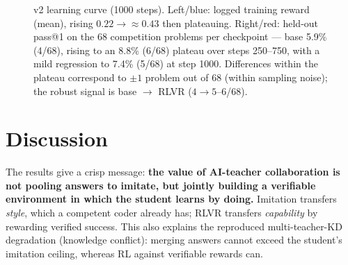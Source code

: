 \documentclass[11pt]{article}
\begin{document}
\begin{figure}[h]\centering
{}
\caption{v2 learning curve (1000 steps). Left/blue: logged training reward (mean), rising
$0.22\to{\approx}0.43$ then plateauing. Right/red: held-out pass@1 on the 68 competition problems
per checkpoint --- base 5.9\% (4/68), rising to an 8.8\% (6/68) plateau over steps 250--750,
with a mild regression to 7.4\% (5/68) at step 1000. Differences within the plateau correspond to
$\pm1$ problem out of 68 (within sampling noise); the robust signal is base $\to$ RLVR ($4\to5$--$6$/68).}
\end{figure}

\section{Discussion}
The results give a crisp message: \textbf{the value of AI-teacher collaboration is not pooling
answers to imitate, but jointly building a verifiable environment in which the student learns by
doing.} Imitation transfers \emph{style}, which a competent coder already has; RLVR transfers
\emph{capability} by rewarding verified success. This also explains the reproduced
multi-teacher-KD degradation (knowledge conflict): merging answers cannot exceed the student's
imitation ceiling, whereas RL against verifiable rewards can.
\end{document}
